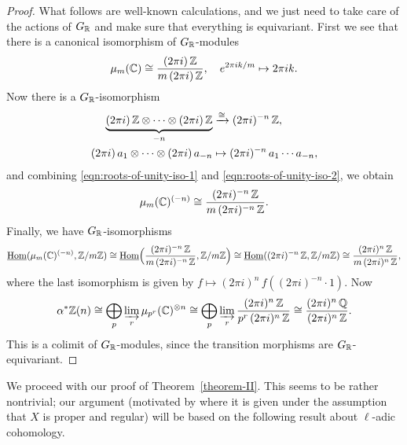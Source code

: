 \documentclass{article}
\numberwithin{equation}{section}
\begin{document}
\begin{proposition}
\begin{proof}
    What follows are well-known calculations, and we just need to take care of
    the actions of $G_{\mathbb{R}}$ and make sure that everything is equivariant. First
    we see that there is a canonical isomorphism of $G_{\mathbb{R}}$-modules
    \begin{equation}
      \label{eqn:roots-of-unity-iso-1}
      \mu_m (\mathbb{C}) \cong \frac{(2\pi i) \, \mathbb{Z}}{m\,(2\pi i)\,\mathbb{Z}}, \quad
      e^{2\pi i k/m} \mapsto 2\pi i k.
    \end{equation}
    Now there is a $G_{\mathbb{R}}$-isomorphism
    \begin{align}
      \label{eqn:roots-of-unity-iso-2}
      \underbrace{(2\pi i)\,\mathbb{Z}\otimes\cdots\otimes (2\pi i)\,\mathbb{Z}}_{-n} & \xrightarrow{\cong} (2\pi i)^{-n}\,\mathbb{Z},\\
      \notag (2\pi i)\,a_1\otimes\cdots\otimes (2\pi i)\,a_{-n} & \mapsto (2\pi i)^{-n}\,a_1\cdots a_{-n},
    \end{align}
    and combining \eqref{eqn:roots-of-unity-iso-1}
    and \eqref{eqn:roots-of-unity-iso-2}, we obtain
    $$\mu_m (\mathbb{C})^{(-n)} \cong \frac{(2\pi i)^{-n} \, \mathbb{Z}}{m\,(2\pi i)^{-n}\,\mathbb{Z}}.$$
    Finally, we have $G_{\mathbb{R}}$-isomorphisms
    \[ \underline{\operatorname{Hom}} (\mu_m (\mathbb{C})^{(-n)}, \mathbb{Z}/m\mathbb{Z}) \cong
    \underline{\operatorname{Hom}} \Bigl(\frac{(2\pi i)^{-n} \, \mathbb{Z}}{m\,(2\pi i)^{-n}\,\mathbb{Z}}, \mathbb{Z}/m\mathbb{Z}\Bigr) \cong
    \underline{\operatorname{Hom}} ((2\pi i)^{-n}\,\mathbb{Z}, \mathbb{Z}/m\mathbb{Z}) \cong
    \frac{(2\pi i)^n\,\mathbb{Z}}{m\,(2\pi i)^n\,\mathbb{Z}}, \]
    where the last isomorphism is given by
    $f \mapsto (2\pi i)^n \, f ((2\pi i)^{-n}\cdot 1)$.
    Now
    \[ \alpha^* \mathbb{Z} (n) \cong
    \bigoplus_p \varinjlim_r \mu_{p^r} (\mathbb{C})^{\otimes n} \cong
    \bigoplus_p \varinjlim_r \frac{(2\pi i)^n\,\mathbb{Z}}{p^r\,(2\pi i)^n\,\mathbb{Z}} \cong
    \frac{(2\pi i)^n\,\mathbb{Q}}{(2\pi i)^n\,\mathbb{Z}}. \]
    This is a colimit of $G_{\mathbb{R}}$-modules, since the transition morphisms are
    $G_{\mathbb{R}}$-equivariant.
  \end{proof}
\end{proposition}

We proceed with our proof of Theorem~\ref{theorem-II}. This seems to be rather
nontrivial; our argument (motivated by \cite{Flach-Morin-2018} where it is given
under the assumption that $X$ is proper and regular) will be based on the
following result about $\ell$-adic cohomology.
\end{document}
